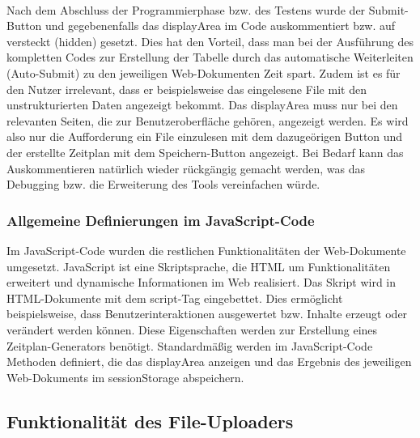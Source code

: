 {\\
Nach dem Abschluss der Programmierphase bzw. des Testens wurde der Submit-Button und gegebenenfalls das displayArea im Code auskommentiert bzw. auf versteckt (hidden) gesetzt. Dies hat den Vorteil, dass man bei der Ausführung des kompletten Codes zur Erstellung der Tabelle durch das automatische Weiterleiten (Auto-Submit) zu den jeweiligen Web-Dokumenten Zeit spart. Zudem ist es für den Nutzer irrelevant, dass er beispielsweise das eingelesene File mit den unstrukturierten Daten angezeigt bekommt. Das displayArea muss nur bei den relevanten Seiten, die zur Benutzeroberfläche gehören, angezeigt werden. Es wird also nur die Aufforderung ein File einzulesen mit dem dazugeörigen Button und der erstellte Zeitplan mit dem Speichern-Button angezeigt. 
Bei Bedarf kann das Auskommentieren natürlich wieder rückgängig gemacht werden, was das Debugging bzw. die Erweiterung des Tools vereinfachen würde. 

\subsubsection{Allgemeine Definierungen im JavaScript-Code}
Im JavaScript-Code wurden die restlichen Funktionalitäten der Web-Dokumente umgesetzt. JavaScript ist eine Skriptsprache, die HTML um Funktionalitäten erweitert und dynamische Informationen im Web realisiert. Das Skript wird in HTML-Dokumente mit dem script-Tag eingebettet. Dies ermöglicht beispielsweise, dass Benutzerinteraktionen ausgewertet bzw. Inhalte erzeugt oder verändert werden können. Diese Eigenschaften werden zur Erstellung eines Zeitplan-Generators benötigt. 
Standardmäßig werden im JavaScript-Code Methoden definiert, die das displayArea anzeigen und das Ergebnis des jeweiligen Web-Dokuments im sessionStorage abspeichern.


\subsection{Funktionalität des File-Uploaders}
  
}
